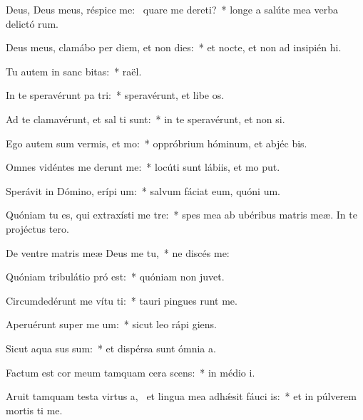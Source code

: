 \item Deus, Deus meus, réspice  me:~\pscross{} quare me dereti?~* longe a salúte mea verba delictó rum.
\item Deus meus, clamábo per diem, et non dies:~* et nocte, et non ad insipién hi.
\item Tu autem in sanc bitas:~*  raël.
\item In te speravérunt pa tri:~* speravérunt, et libe os.
\item Ad te clamavérunt, et sal ti sunt:~* in te speravérunt, et non  si.
\item Ego autem sum vermis, et  mo:~* oppróbrium hóminum, et abjéc bis.
\item Omnes vidéntes me derunt me:~* locúti sunt lábiis, et mo put.
\item Sperávit in Dómino, erípi um:~* salvum fáciat eum, quóni  um.
\item Quóniam tu es, qui extraxísti me  tre:~* spes mea ab ubéribus matris meæ. In te projéctus   tero.
\item De ventre matris meæ Deus me  tu,~* ne discés  me:
\item Quóniam tribulátio pró est:~* quóniam non   juvet.
\item Circumdedérunt me vítu ti:~* tauri pingues runt me.
\item Aperuérunt super me  um:~* sicut leo rápi  giens.
\item Sicut aqua sus sum:~* et dispérsa sunt ómnia  a.
\item Factum est cor meum tamquam cera scens:~* in médio  i.
\item Aruit tamquam testa virtus a,~\pscross{} et lingua mea adhǽsit fáuci is:~* et in púlverem mortis ti me.
